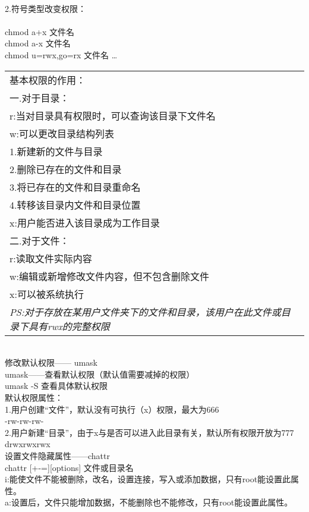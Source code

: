 \documentclass[12pt]{article}
\begin{document}
\begin{flushleft}
{\\
2.符号类型改变权限：\\
\\
chmod a+x 文件名\\
chmod a-x 文件名\\
chmod u=rwx,go=rx 文件名 \ldots\\
\begin{tabular}{|l|}
\hline
基本权限的作用：\\
一.对于目录：\\
r:当对目录具有权限时，可以查询该目录下文件名\\
w:可以更改目录结构列表\\
1.新建新的文件与目录\\
2.删除已存在的文件和目录\\
3.将已存在的文件和目录重命名\\
4.转移该目录内文件和目录位置\\
x:用户能否进入该目录成为工作目录\\
二.对于文件：\\
r:读取文件实际内容\\
w:编辑或新增修改文件内容，但不包含删除文件\\
x:可以被系统执行\\
\emph{PS:对于存放在某用户文件夹下的文件和目录，该用户在此文件或目录下具有rwx的完整权限}\\
\hline
\end{tabular}}\\
修改默认权限——{} umask\\umask——查看默认权限（默认值需要减掉的权限）\\umask -S 查看具体默认权限\\
默认权限属性：\\
1.用户创建``文件''，默认没有可执行（x）权限，最大为666\\
-rw-rw-rw-\\
2.用户新建``目录''，由于x与是否可以进入此目录有关，默认所有权限开放为777\\
drwxrwxrwx\\

设置文件隐藏属性——chattr\\
chattr [+-=][options] 文件或目录名\\
i:能使文件不能被删除，改名，设置连接，写入或添加数据，只有root能设置此属性。\\
a:设置后，文件只能增加数据，不能删除也不能修改，只有root能设置此属性。\\


\end{flushleft}
\end{document}
